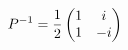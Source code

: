 \documentclass[preview]{standalone}
\begin{document}
\begin{align*}
\special{dvisvgm:raw <g id='unique000'>}P^{-1}=\dfrac{1}{2}\begin{pmatrix}1&i\\1&-i\end{pmatrix}\special{dvisvgm:raw </g>}
\end{align*}
\end{document}
